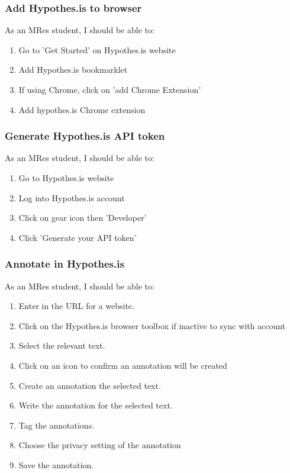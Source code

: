 \documentclass{article}
\begin{document}
\subsubsection*{Add Hypothes.is to browser}

As an MRes student, I should be able to:
\begin{enumerate}
\item Go to 'Get Started' on Hypothes.is website
\item Add Hypothes.is bookmarklet
\item If using Chrome, click on 'add Chrome Extension'
\item Add hypothes.is Chrome extension
\end{enumerate}

\subsubsection*{Generate Hypothes.is API token}
As an MRes student, I should be able to:
\begin{enumerate}
\item Go to Hypothes.is website
\item Log into Hypothes.is account
\item Click on gear icon then 'Developer'
\item Click 'Generate your API token'
\end{enumerate}

\subsubsection*{Annotate in Hypothes.is}

As an MRes student, I should be able to:
\begin{enumerate}
\item Enter in the URL for a website. 
\item Click on the Hypothes.is browser toolbox if inactive to sync with account
\item Select the relevant text. 
\item Click on an icon to confirm an annotation will be created
\item Create an annotation the selected text.
\item Write the annotation for the selected text.
\item Tag the annotations. 
\item Choose the privacy setting of the annotation
\item Save the annotation. 
\end{enumerate}
\end{document}
